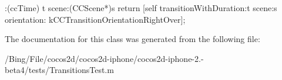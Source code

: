 \begin{DoxyCode}
                            :(ccTime) t scene:(CCScene*)s {
        return [self transitionWithDuration:t scene:s orientation:
      kCCTransitionOrientationRightOver];
}
\end{DoxyCode}


The documentation for this class was generated from the following file\-:\begin{DoxyCompactItemize}
\item 
/\-Bing/\-File/cocos2d/cocos2d-\/iphone/cocos2d-\/iphone-\/2.-\/beta4/tests/Transitions\-Test.\-m\end{DoxyCompactItemize}
